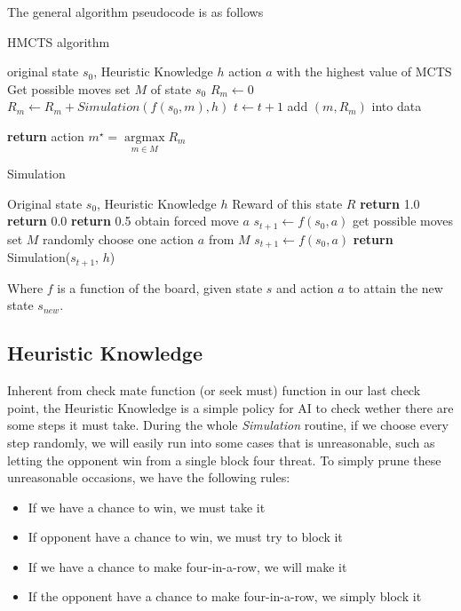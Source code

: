 \documentclass[a4paper, 11pt]{article} %
\begin{document}
\begin{multicols}{2}
		The general algorithm pseudocode is as follows
		
		\begin{algorithm}[H]
			\caption{HMCTS algorithm}
			\begin{algorithmic}[1]
				\Require original state $s_0$, Heuristic Knowledge $h$
				\Ensure action $a$ with the highest value of MCTS
				\State Get possible moves set $M$ of state $s_0$
					\State $R_m \gets 0$
						\State $R_m \gets R_m + Simulation(f(s_0, m), h)$
						\State $t \gets t + 1$
					\EndWhile
					\State add $(m, R_m)$ into data
				\EndFor
				
				\State \textbf{return} action $m^\star = \mathop{\arg\max}\limits_{m \in M} R_m$
			\end{algorithmic}
		\end{algorithm}
	\begin{algorithm}[H]
		\caption{Simulation}
		\begin{algorithmic}[1]
			\Require Original state $s_0$, Heuristic Knowledge $h$
			\Ensure Reward of this state $R$
					\State \textbf{return} 1.0
					\State \textbf{return} 0.0
				\Else
					\State \textbf{return} 0.5
				\EndIf
			\EndIf
				\State obtain forced move $a$
				\State $s_{t + 1} \gets f(s_0, a)$
			\Else
				\State get possible moves set $M$
				\State randomly choose one action $a$ from $M$
				\State $s_{t + 1} \gets f(s_0, a)$
			\EndIf
			\State \textbf{return} Simulation($s_{t + 1}$, $h$)
		\end{algorithmic}
	\end{algorithm}
	
	Where $f$ is a function of the board, given state $s$ and action $a$ to attain the new state $s_{new}$.
	
	\subsection{Heuristic Knowledge}
	
	Inherent from check mate function (or seek must) function in our last check point, the Heuristic Knowledge is a simple policy for AI to check wether there are some steps it must take. During the whole \textit{Simulation} routine, if we choose every step randomly, we will easily run into some cases that is unreasonable, such as letting the opponent win from a single block four threat. To simply prune these unreasonable occasions, we have the following rules:
	\begin{itemize}
		\item If we have a chance to win, we must take it
		\item If opponent have a chance to win, we must try to block it
		\item If we have a chance to make four-in-a-row, we will make it
		\item If the opponent have a chance to make four-in-a-row, we simply block it
	\end{itemize}


\end{multicols}
\end{document}
